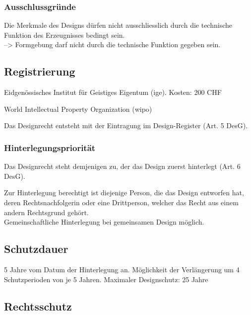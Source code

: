 \subsubsection{Ausschlussgründe}

Die Merkmale des Designs dürfen nicht ausschliesslich durch die
technische Funktion des Erzeugnisses bedingt sein.\\
--> Formgebung darf nicht durch die technische Funktion
gegeben sein.

\subsection{Registrierung}
\label{sec:Designrecht-Registrierung}

\begin{description}
	\tightlist
	\item[Schweiz] Eidgenössisches Institut für Geistiges Eigentum 
	(ige). Kosten: 200 CHF
	\item[International] World Intellectual Property Organization
	(wipo)
\end{description}

Das Designrecht entsteht mit der Eintragung im Design-Register
(Art. 5 DesG).


\subsubsection{Hinterlegungspriorität}
\label{sec:Designrecht-Hinterlegungsprioritaet}

Das Designrecht steht demjenigen zu, der das Design zuerst hinterlegt
(Art. 6 DesG).

Zur Hinterlegung berechtigt ist diejenige Person, die das Design
entworfen hat, deren Rechtsnachfolgerin oder eine Drittperson, welcher
das Recht aus einem andern Rechtsgrund gehört.\\
Gemeinschaftliche Hinterlegung bei gemeinsamen Design möglich.

\subsection{Schutzdauer}

5 Jahre vom Datum der Hinterlegung an. Möglichkeit der Verlängerung um
4 Schutzperioden von je 5 Jahren. Maximaler Designschutz: 25 Jahre

\subsection{Rechtsschutz}

